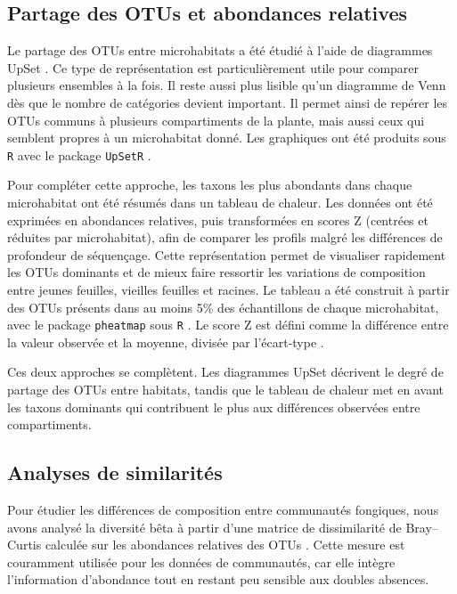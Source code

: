 \documentclass[alpha-refs,twocolumn]{wiley-article}
\begin{document}
\subsection{Partage des OTUs et abondances relatives}
Le partage des OTUs entre microhabitats a été étudié à l’aide de diagrammes UpSet \citep{lex2014upset}. Ce type de représentation est particulièrement utile pour comparer plusieurs ensembles à la fois. Il reste aussi plus lisible qu’un diagramme de Venn dès que le nombre de catégories devient important. Il permet ainsi de repérer les OTUs communs à plusieurs compartiments de la plante, mais aussi ceux qui semblent propres à un microhabitat donné. Les graphiques ont été produits sous \texttt{R} avec le package \texttt{UpSetR} \citep{conway2017upsetr}.

Pour compléter cette approche, les taxons les plus abondants dans chaque microhabitat ont été résumés dans un tableau de chaleur. Les données ont été exprimées en abondances relatives, puis transformées en scores Z (centrées et réduites par microhabitat), afin de comparer les profils malgré les différences de profondeur de séquençage. Cette représentation permet de visualiser rapidement les OTUs dominants et de mieux faire ressortir les variations de composition entre jeunes feuilles, vieilles feuilles et racines. Le tableau a été construit à partir des OTUs présents dans au moins 5\% des échantillons de chaque microhabitat, avec le package \texttt{pheatmap} sous \texttt{R} \citep{kolde2019pheatmap}. Le score Z est défini comme la différence entre la valeur observée et la moyenne, divisée par l'écart-type \citep{altman1991practical}.

Ces deux approches se complètent. Les diagrammes UpSet décrivent le degré de partage des OTUs entre habitats, tandis que le tableau de chaleur met en avant les taxons dominants qui contribuent le plus aux différences observées entre compartiments.

\subsection{Analyses de similarités}

Pour étudier les différences de composition entre communautés fongiques, nous avons analysé la diversité bêta à partir d’une matrice de dissimilarité de Bray--Curtis calculée sur les abondances relatives des OTUs \citep{bray1957ordination}. Cette mesure est couramment utilisée pour les données de communautés, car elle intègre l’information d’abondance tout en restant peu sensible aux doubles absences.
\end{document}
